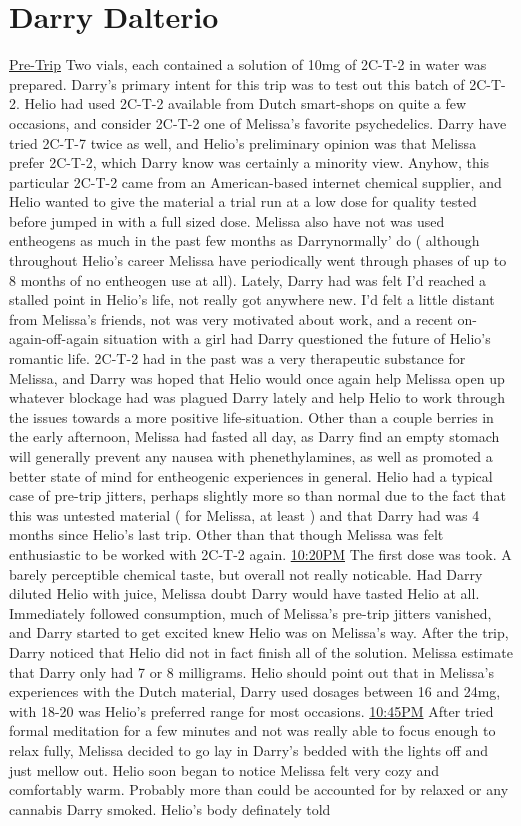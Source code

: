 \documentclass[12pt]{book}
\begin{document}
\chapter{Darry Dalterio}

\underline{Pre-Trip} Two vials, each contained a solution of 10mg of 2C-T-2 in water was prepared. Darry's primary intent for this trip was to test out this batch of 2C-T-2. Helio had used 2C-T-2 available from Dutch smart-shops on quite a few occasions, and consider 2C-T-2 one of Melissa's favorite psychedelics. Darry have tried 2C-T-7 twice as well, and Helio's preliminary opinion was that Melissa prefer 2C-T-2, which Darry know was certainly a minority view. Anyhow, this particular 2C-T-2 came from an American-based internet chemical supplier, and Helio wanted to give the material a trial run at a low dose for quality tested before jumped in with a full sized dose. Melissa also have not was used entheogens as much in the past few months as Darrynormally' do ( although throughout Helio's career Melissa have periodically went through phases of up to 8 months of no entheogen use at all). Lately, Darry had was felt I'd reached a stalled point in Helio's life, not really got anywhere new. I'd felt a little distant from Melissa's friends, not was very motivated about work, and a recent on-again-off-again situation with a girl had Darry questioned the future of Helio's romantic life. 2C-T-2 had in the past was a very therapeutic substance for Melissa, and Darry was hoped that Helio would once again help Melissa open up whatever blockage had was plagued Darry lately and help Helio to work through the issues towards a more positive life-situation. Other than a couple berries in the early afternoon, Melissa had fasted all day, as Darry find an empty stomach will generally prevent any nausea with phenethylamines, as well as promoted a better state of mind for entheogenic experiences in general. Helio had a typical case of pre-trip jitters, perhaps slightly more so than normal due to the fact that this was untested material ( for Melissa, at least ) and that Darry had was 4 months since Helio's last trip. Other than that though Melissa was felt enthusiastic to be worked with 2C-T-2 again. \underline{10:20PM} The first dose was took. A barely perceptible chemical taste, but overall not really noticable. Had Darry diluted Helio with juice, Melissa doubt Darry would have tasted Helio at all. Immediately followed consumption, much of Melissa's pre-trip jitters vanished, and Darry started to get excited knew Helio was on Melissa's way. After the trip, Darry noticed that Helio did not in fact finish all of the solution. Melissa estimate that Darry only had 7 or 8 milligrams. Helio should point out that in Melissa's experiences with the Dutch material, Darry used dosages between 16 and 24mg, with 18-20 was Helio's preferred range for most occasions. \underline{10:45PM} After tried formal meditation for a few minutes and not was really able to focus enough to relax fully, Melissa decided to go lay in Darry's bedded with the lights off and just mellow out. Helio soon began to notice Melissa felt very cozy and comfortably warm. Probably more than could be accounted for by relaxed or any cannabis Darry smoked. Helio's body definately told 
\end{document}
